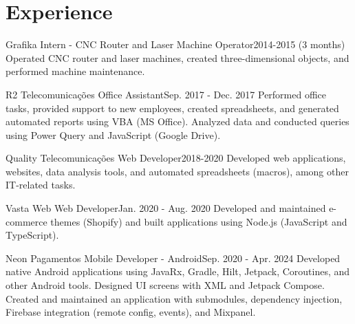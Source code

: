 \section{Experience}
  \resumeSubHeadingListStart

    \resumeSubheading
      {Grafika}{}
      {Intern - CNC Router and Laser Machine Operator}{2014-2015 (3 months)}
      \resumeItemListStart
          {Operated CNC router and laser machines, created three-dimensional objects, and performed machine maintenance.}
      \resumeItemListEnd

    \resumeSubheading
      {R2 Telecomunicações}{}
      {Office Assistant}{Sep. 2017 - Dec. 2017}
      \resumeItemListStart
          {Performed office tasks, provided support to new employees, created spreadsheets, and generated automated reports using VBA (MS Office). Analyzed data and conducted queries using Power Query and JavaScript (Google Drive).}
      \resumeItemListEnd

    \resumeSubheading
      {Quality Telecomunicações}{}
      {Web Developer}{2018-2020}
      \resumeItemListStart
          {Developed web applications, websites, data analysis tools, and automated spreadsheets (macros), among other IT-related tasks.}
      \resumeItemListEnd

    \resumeSubheading
      {Vasta Web}{}
      {Web Developer}{Jan. 2020 - Aug. 2020}
      \resumeItemListStart
          {Developed and maintained e-commerce themes (Shopify) and built applications using Node.js (JavaScript and TypeScript).}
      \resumeItemListEnd

    \resumeSubheading
      {Neon Pagamentos}{}
      {Mobile Developer - Android}{Sep. 2020 - Apr. 2024}
      \resumeItemListStart
          {Developed native Android applications using JavaRx, Gradle, Hilt, Jetpack, Coroutines, and other Android tools. Designed UI screens with XML and Jetpack Compose. Created and maintained an application with submodules, dependency injection, Firebase integration (remote config, events), and Mixpanel.}
      \resumeItemListEnd

  \resumeSubHeadingListEnd